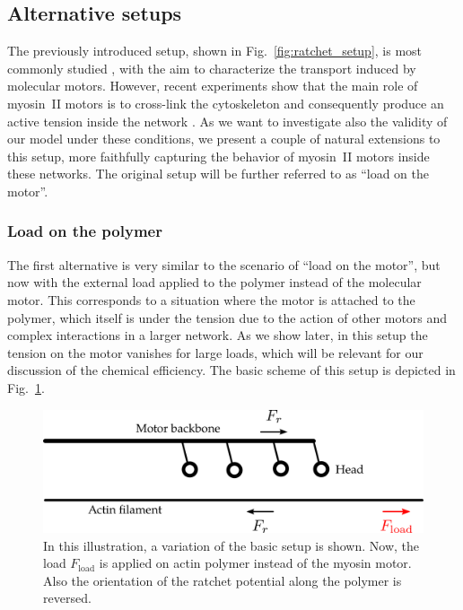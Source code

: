 \documentclass[aps,pre,twocolumn,showpacs,showkeys,superscriptaddress,floatfix]{revtex4-1}
\begin{document}
\subsection{Alternative setups}
\label{sec:other_setups}
The previously introduced setup, shown in Fig.~\ref{fig:ratchet_setup}, is most commonly studied \cite{reimann2002brownian,astumian1994fluctuation,finer1994single,julicher1997modeling,kishino1988force,peskin1995correlation,saito1994movement},
with the aim to characterize the transport induced by molecular motors.
However, recent experiments show that the main role of myosin~II motors is to cross-link the cytoskeleton \cite{ma2012nonmuscle}
and consequently produce an active tension inside the network \cite{chugh2017actin,monier2010actomyosin}.
As we want to investigate also the validity of our model under these conditions, 
we present a couple of natural extensions to this setup, more faithfully capturing the behavior of myosin~II motors inside these networks.
The original setup will be further referred to as ``load on the motor''.

\subsubsection{Load on the polymer}
\label{sec:load_on_polymer}
The first alternative is very similar to the scenario of ``load on the motor'', 
but now with the external load applied to the polymer instead of the molecular motor. 
This corresponds to a situation where the motor is attached to the polymer, which itself is under the tension due to the action of other motors and complex interactions in a larger network.
As we  show later, in this setup the tension on the motor vanishes for large loads, which will be relevant for our discussion of the chemical efficiency. 
The basic scheme of this setup is depicted in Fig.~\ref{fig:load_on_polymer setup}.
\begin{figure}[t]
\centering
\includegraphics[width=0.9\linewidth,height=!]{load_on_polymer_illustration}
\caption{
\label{fig:load_on_polymer setup}
In this illustration, a variation of the basic setup is shown.  
Now, the load $F_\text{load}$ is applied on actin polymer instead of the myosin motor. 
Also the orientation of the ratchet potential along the polymer is reversed.
} 
\end{figure}
\end{document}
